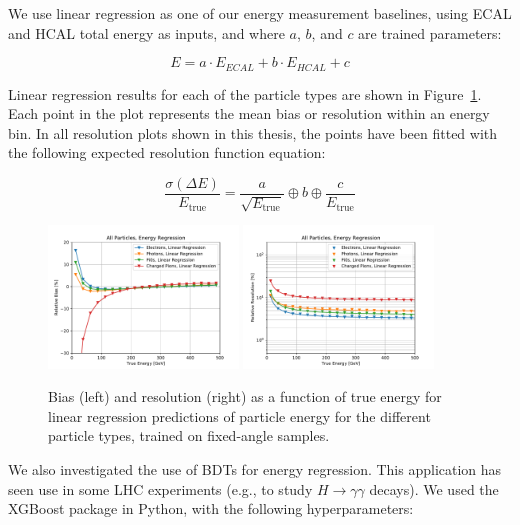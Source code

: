 We use linear regression as one of our energy measurement baselines, using ECAL and HCAL total energy as inputs, and where $a$, $b$, and $c$ are trained parameters:

\begin{equation}
E = a \cdot E_{ECAL} + b \cdot E_{HCAL} + c
\label{eq:linreg}
\end{equation}

Linear regression results for each of the particle types are shown in Figure~\ref{fig:reg_linreg}. Each point in the plot represents the mean bias or resolution within an energy bin. In all resolution plots shown in this thesis, the points have been fitted with the following expected resolution function equation:

\begin{equation}
\frac{\sigma(\Delta E)}{E_{\text{true}}} = \frac{a}{\sqrt{E_{\text{true}}}} \oplus b \oplus \frac{c}{E_{\text{true}}}
\label{eq:res}
\end{equation}

\begin{figure}[htbp]
\centering
\includegraphics[width=0.45\textwidth]{Images/Calo/bias_vs_E_allparts_linreg.pdf}
\includegraphics[width=0.45\textwidth]{Images/Calo/res_vs_E_allparts_linreg_fits.pdf}
\caption{Bias (left) and resolution (right) as a function of true energy for linear regression predictions of particle energy for the different particle types, trained on fixed-angle samples. \label{fig:reg_linreg}}
\end{figure}

We also investigated the use of BDTs for energy regression. This application has seen use in some LHC experiments (e.g., to study $H \rightarrow \gamma\gamma$ decays).  We used the XGBoost package in Python, with the following hyperparameters:

